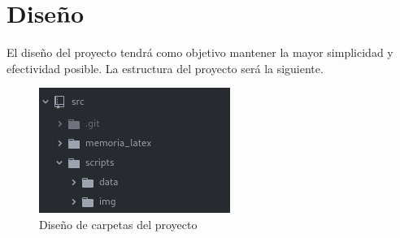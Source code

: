 
\chapter{Diseño}


El diseño del proyecto tendrá como objetivo mantener la mayor simplicidad y efectividad posible. La estructura del proyecto será la siguiente. 
\begin{figure}[H]
	\centering
	\includegraphics[scale=1]{imagenes/carpetas.png}
	\caption{Diseño de carpetas del proyecto}
	\label{fig:carpetas}
\end{figure}